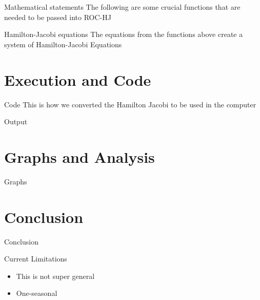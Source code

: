 \documentclass{beamer}
\begin{document}
\begin{frame}{Mathematical statements}
    The following are some crucial functions that are needed to be passed into ROC-HJ
\end{frame}

\begin{frame}{Hamilton-Jacobi equations}
    The equations from the functions above create a system of Hamilton-Jacobi Equations
\end{frame}

\section{Execution and Code}
\begin{frame}{Code}
    This is how we converted the Hamilton Jacobi to be used in the computer
\end{frame}

\begin{frame}{Output}
    
\end{frame}

\section{Graphs and Analysis}
\begin{frame}{Graphs}
    
\end{frame}

\section{Conclusion}
\begin{frame}{Conclusion}
    
\end{frame}

\begin{frame}{Current Limitations}
    \begin{itemize}
        \item This is not super general
        \item One-seasonal
    \end{itemize}
\end{frame}
\end{document}
